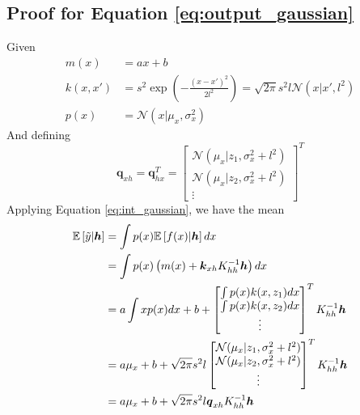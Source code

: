 \documentclass{article}
\begin{document}
\begin{appendices}
    \subsection{Proof for Equation \ref{eq:output_gaussian}}
    Given
    \begin{equation}
        \begin{aligned}
            m(x)&=ax+b \\
            k(x,x')&=s^2 \exp(-\frac{(x-x')^2}{2l^2})=\sqrt{2\pi}s^2l\mathcal{N}(x|x',l^2) \\
            p(x)&=\mathcal{N}(x|\mu_x,\sigma_x^2)
        \end{aligned}
    \end{equation}
    And defining
    \begin{equation}
        \boldsymbol{q}_{xh}=\boldsymbol{q}_{hx}^T=\begin{bmatrix}
            \mathcal{N}(\mu_x|z_1,\sigma_x^2+l^2) \\
            \mathcal{N}(\mu_x|z_2,\sigma_x^2+l^2) \\
            \vdots
        \end{bmatrix}^T
    \end{equation}
    Applying Equation \ref{eq:int_gaussian}, we have the mean
    \begin{equation}
        \begin{aligned}
            \mathbb{E}\left[\Tilde{y}|\boldsymbol{h}\right]&=\int p(x)\mathbb{E}\left[f(x)|\boldsymbol{h}\right]dx \\
            &=\int p(x)\left(m(x)+\boldsymbol{k}_{xh}K_{hh}^{-1}\boldsymbol{h}\right)dx \\
            &=a\int xp(x)dx + b + \begin{bmatrix}
                \int p(x)k(x,z_1)dx \\
                \int p(x)k(x,z_2)dx \\
                \vdots
            \end{bmatrix}^T K_{hh}^{-1}\boldsymbol{h} \\
            &=a\mu_x+b+\sqrt{2\pi}s^2l\begin{bmatrix}
                \mathcal{N}(\mu_x|z_1,\sigma_x^2+l^2) \\
                \mathcal{N}(\mu_x|z_2,\sigma_x^2+l^2) \\
                \vdots
            \end{bmatrix}^TK_{hh}^{-1}\boldsymbol{h} \\
            &=a\mu_x+b+\sqrt{2\pi}s^2l\boldsymbol{q}_{xh}K_{hh}^{-1}\boldsymbol{h}

\end{aligned}
\end{equation}
\end{appendices}
\end{document}
